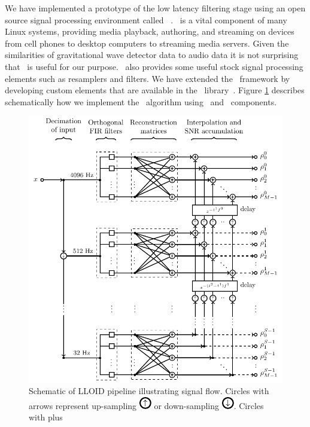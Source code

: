 We have implemented a prototype of the low latency filtering stage using an
open source signal processing environment called \gstreamer\ \cite{gstreamer}.
\gstreamer\ is a vital component of many Linux systems, providing media
playback, authoring, and streaming on devices from cell phones to desktop
computers to streaming media servers.  Given the similarities of gravitational
wave detector data to audio data it is not surprising that \gstreamer\ is
useful for our purpose. \gstreamer\ also provides some useful stock signal
processing elements such as resamplers and filters.  We have extended the
\gstreamer\ framework by developing custom elements that are available in the
\gstlal\ library~\cite{gstlal}.  Figure \ref{fig:pipeline} describes
schematically how we implement the \lloid\ algorithm using \gstlal\ and
\gstreamer\ components.
%
%
\begin{figure}[htbp]
	\includegraphics{figures/lloid-diagram.pdf}
	\caption{\label{fig:pipeline} Schematic of LLOID pipeline illustrating
signal flow.  Circles with arrows represent up-sampling
\protect\includegraphics{figures/upsample-symbol.pdf} or down-sampling
\protect\includegraphics{figures/downsample-symbol.pdf}.  Circles with plus
}
\end{figure}
